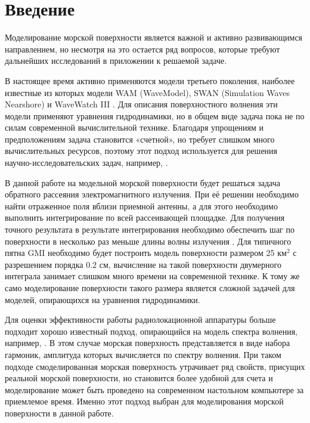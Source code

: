 \section*{Введение}
Моделирование морской поверхности является важной и активно развивающимся
направлением, но несмотря на это остается ряд вопросов, которые требуют дальнейших исследований в приложении к решаемой
задаче. 

В настоящее время активно применяются модели третьего поколения, наиболее
известные из которых модели WAM (WaveModel), SWAN (Simulation Waves Nearshore)
и WaveWatch III \cite{wavewatch3, swan, wam4}.  Для описания поверхностного
волнения эти модели применяют уравнения гидродинамики, но в общем виде задача
пока не по силам современной вычислительной технике. Благодаря упрощениям и
предположениям задача становится «счетной», но требует слишком много
вычислительных ресурсов, поэтому этот подход используется для решения
научно-исследовательских задач, например, \cite{slunyaev2006, slunyaev2009,
west1987}. 

В данной работе на модельной морской поверхности будет решаться задача
обратного рассеяния электромагнитного излучения.  При её решении необходимо
найти отраженное поля вблизи приемной антенны, а для этого необходимо выполнить
интегрирование по всей рассеивающей площадке.  Для получения точного результата в результате интегрирования необходимо
обеспечить шаг по поверхности в несколько раз меньше длины волны излучения
\cite{toporkov:brown:2000, toporkov:brown:2002}. Для типичного пятна GMI необходимо будет построить
модель поверхности
размером 25 км$^2$ с разрешением порядка $0.2$ см, вычисление на такой
поверхности двумерного интеграла занимает слишком много времени на современной
технике. К тому же само моделирование поверхности такого размера является
сложной задачей для моделей, опирающихся на уравнения гидродинамики. 

Для оценки эффективности работы радиолокационной аппаратуры
больше подходит хорошо известный подход, опирающийся на модель спектра
волнения, например, \cite{longe-higgins}. В этом случае морская поверхность представляется в
виде набора гармоник, амплитуда которых вычисляется по спектру волнения. При
таком подходе смоделированная морская поверхность утрачивает ряд свойств,
присущих реальной морской поверхности, но становится более удобной для счета и
моделирование может быть проведено на современном настольном компьютере за
приемлемое время. Именно этот подход выбран для моделирования морской поверхности в данной работе. 

